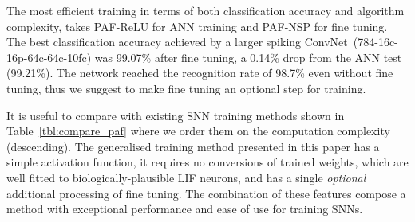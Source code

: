 	
	
	
	The most efficient training in terms of both classification accuracy and algorithm complexity, takes PAF-ReLU for ANN training and PAF-NSP for fine tuning.
	The best classification accuracy achieved by a larger spiking ConvNet~(784-16c-16p-64c-64c-10fc) was 99.07\% after fine tuning, a 0.14\% drop from the ANN test (99.21\%).
	The network reached the recognition rate of 98.7\% even without fine tuning, thus we suggest to make fine tuning an optional step for training.
	
	
	It is useful to compare with existing SNN training methods shown in Table~\ref{tbl:compare_paf} where we order them on the computation complexity (descending).
	The generalised training method presented in this paper has a simple activation function, it requires no conversions of trained weights, which are well fitted to biologically-plausible LIF neurons, and has a single \emph{optional} additional processing of fine tuning.
	The combination of these features compose a method with exceptional performance and ease of use for training SNNs.
	
